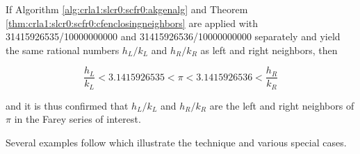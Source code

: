 \noindent{}If 
Algorithm \ref{alg:crla1:slcr0:scfr0:akgenalg}
and
Theorem \ref{thm:crla1:slcr0:scfr0:cfenclosingneighbors} are
applied with 31415926535/10000000000 and 31415926536/10000000000 
separately and yield the same rational numbers $h_L/k_L$ and $h_R/k_R$ as 
left and right neighbors, then

\begin{equation}
\label{eq:crla1:slcr0:scfr0:31}
\frac{h_L}{k_L} < 3.1415926535 < \pi < 3.1415926536 < \frac{h_R}{k_R}
\end{equation}  

\noindent{}and it is thus confirmed that $h_L/k_L$ and $h_R/k_R$ are the left
and right neighbors of $\pi$ in the Farey series of interest.

Several examples follow which illustrate the technique and various special
cases.

